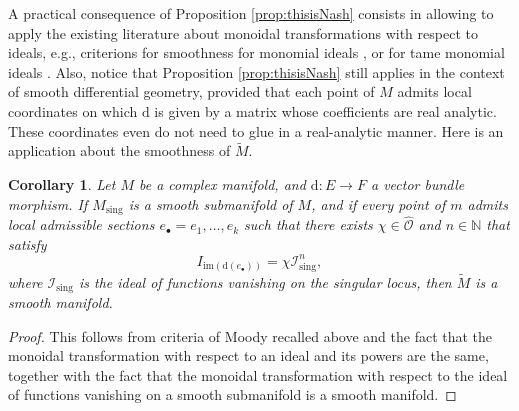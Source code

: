 \documentclass[10pt]{article}
\theoremstyle{plain}
\newtheorem{corollary}[lemma]{Corollary}
\theoremstyle{definition}
\theoremstyle{remark}
\newcommand{\dd}{\mathrm{d}}
\begin{document}
A practical consequence of Proposition \ref{prop:thisisNash} consists in allowing to apply the existing literature about monoidal transformations with respect to ideals, e.g., criterions for smoothness  for monomial ideals \cite{zbMATH01623323}, or for tame monomial ideals \cite{FABER20111805}. Also, notice that Proposition \ref{prop:thisisNash}  still applies in the context of smooth differential geometry, provided that each point of $M$ admits local coordinates on which $ \dd$ is given by a matrix whose coefficients are real analytic. These coordinates even do not need to glue in a real-analytic manner. Here is an application about the smoothness of $ \tilde{M}$.

\begin{corollary}
Let $M$ be a complex manifold, and $ \dd : E \to F$ a vector bundle morphism.
If $ M_{\mathrm{sing}}$ is a smooth submanifold of $M $, and if every point of $m$ admits local  admissible sections $ e_\bullet = e_1, \dots, e_k$ such that there exists $ \chi \in \hat{\mathcal O}$ and  $n \in \mathbb N$ that satisfy
  $$  I_{{\mathrm{im}}(\dd(e_\bullet))}  = \chi \mathcal I_{\mathrm{sing}}^n , $$
  where $ \mathcal I_{\mathrm{sing}}$ is the ideal of functions vanishing on the singular locus,  
then $ \tilde{M} $ is a smooth manifold.
\end{corollary}
\begin{proof}
This follows from criteria of Moody recalled above and the fact that the monoidal transformation with respect to an ideal and its powers are the same, together with the fact that the monoidal transformation with respect to the ideal of functions vanishing on a smooth submanifold is a smooth manifold.
\end{proof}


\end{document}
